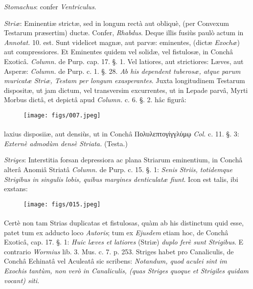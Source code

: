 \documentclass[a4paper, 11pt, oneside, polutonikogreek, german]{article}
\begin{document}
\emph{Stomachus}: confer \emph{Ventriculus}.

\emph{Striæ}: Eminentiæ strictæ, sed in longum rectà aut obliquè, (per Convexum Testarum præsertim) ductæ. Confer, \emph{Rhabdus}. Deque illis fusiùs paulò actum in \emph{Annotat.} 10. est. Sunt videlicet magnæ, aut parvæ: eminentes, (dictæ \emph{Exochæ}) aut compressiores. Et Eminentes quidem vel solidæ, vel fistulosæ, in Conchâ Exoticâ. \emph{Column.} de Purp. cap. 17. §. 1. Vel latiores, aut strictiores: Læves, aut Asperæ: \emph{Column.} de Purp. c. 1. §. 28. \emph{Ab his dependent tuberosæ, atque parum muricatæ Striæ, Testam per longum exasperantes}. Juxta longitudinem Testarum dispositæ, ut jam dictum, vel transversim excurrentes, ut in Lepade parvâ, Myrti Morbus dictâ, et depictâ apud \emph{Column.} c. 6. §. 2. hâc figurâ:

\begin{figure}[H]
\centering
\texttt{[image: figs/007.jpeg]}
\end{figure}
\paragraph{}
laxius disposiiæ, aut densiùs, ut in Conchâ Πολυλεπτογίγγλύμῳ \emph{Col.} c. 11. §. 3: \emph{Externè admodùm densè Striata.} (Testa.)

\emph{Striges}: Interstitia forsan depressiora ac plana Striarum eminentium, in Conchâ alterâ Anomiâ Striatâ \emph{Column.} de Purp. c. 15. §. 1: \emph{Senis Striis, totidemque Strigibus in singulis lobis, quibus margines denticulatæ fiunt}. Icon est talis, ibi exstans:

\begin{figure}[H]
\centering
\texttt{[image: figs/015.jpeg]}
\end{figure}
\paragraph{}
Certè non tam Strias duplicatas et fistulosas, quàm ab his distinctum quid esse, patet tum ex adducto loco \emph{Autoris}; tum ex \emph{Ejusdem} etiam hoc, de Conchâ Exoticâ, cap. 17. §. 1: \emph{Huic læves et latiores} (Striæ) \emph{duplo ferè sunt Strigibus}. E contrario \emph{Wormius} lib. 3. Mus. c. 7. p. 253. Striges habet pro Canaliculis, de Conchâ Echinatâ vel Aculeatâ sic scribens: \emph{Notandum, quod aculei sint im Exochis tantùm, non verò in Canaliculis, (quas Striges quoque et Strigiles quidam vocant) siti.}
\end{document}
